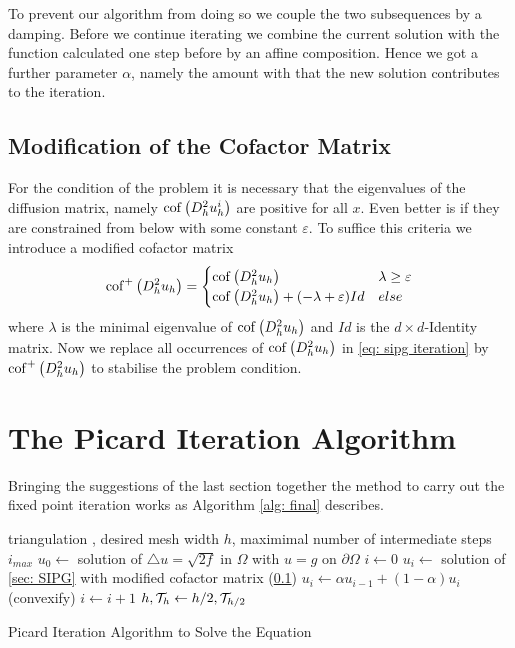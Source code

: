 To prevent our algorithm from doing so we couple the two subsequences by a damping. Before we continue iterating we combine the current solution with the function calculated one step before by an affine composition. Hence we got a further parameter $\alpha$, namely the amount with that the new solution contributes to the iteration.

\subsection{Modification of the Cofactor Matrix}\label{sec: mod cofactor}
For the condition of the problem it is necessary that the eigenvalues of the diffusion matrix, namely $\operatorname{cof} \left( D_h^2 u_h^i \right)$ are positive for all $x$. Even better is if they are constrained from below with some constant $\varepsilon$. 
To suffice this criteria we introduce a modified cofactor matrix
\[ 
	\mycofMod {D^2_h u_h} = \begin{cases}
	\mycof {D^2_h u_h} & \lambda \geq \varepsilon	\\
	\mycof {D^2_h u_h}+ (-\lambda+\varepsilon) Id%
	& else
	\end{cases}
\]
where $\lambda$ is the minimal eigenvalue of $ \operatorname{cof} \left( D^2_h u_h \right)$ and $Id$ is the $d \times d$-Identity matrix. Now we replace all occurrences of $\operatorname{cof} \left( D^2_h u_h \right)$ in \eqref{eq: sipg iteration} by $\operatorname{cof}^+ \left( D^2_h u_h \right)$ to stabilise the problem condition.

\section{The Picard Iteration Algorithm}

Bringing the suggestions of the last section together the method to carry out the fixed point iteration works as Algorithm \ref{alg: final} describes.

\begin{algorithm}
\begin{algorithmic}
\Require triangulation \triang, desired mesh width $h$, maximimal number of intermediate steps $i_{max}$
\State $u_0\gets $ solution of  $
	\triangle u = \sqrt{2f} \text{ in } \Omega $ with $
	u = g \text{ on }\partial \Omega$
	\State $i \gets 0$
		\State $u_i \gets$ solution of \ref{sec: SIPG} with modified cofactor matrix (\ref{sec: mod cofactor})
		\State $u_i \gets \alpha u_{i-1} + (1-\alpha)u_i $
		\State (convexify)
		\State $i \gets i+1$
	\EndWhile
	\State $h, \mathcal{T}_h \gets h/2, \mathcal{T}_{h/2}$
\EndWhile
\end{algorithmic}
\caption{Picard Iteration Algorithm to Solve the \MA Equation}
\label{alg: final}
\end{algorithm}

